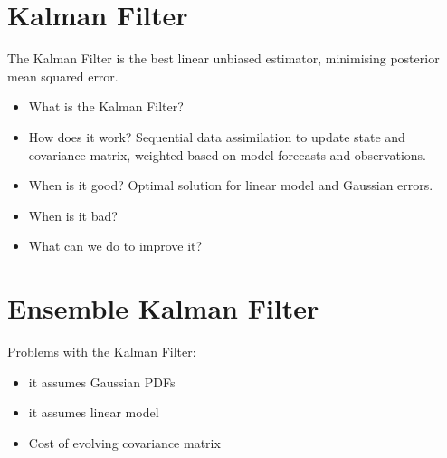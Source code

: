 \section{Kalman Filter}\label{sec:method:kf}

The Kalman Filter \citep{kalman1960new} is the best linear unbiased estimator,
minimising posterior mean squared error.

\begin{itemize}
    \item What is the Kalman Filter?
    \item How does it work? Sequential data assimilation to update state and
        covariance matrix, weighted based on model forecasts and observations.
    \item When is it good? Optimal solution for linear model and Gaussian
        errors.
    \item When is it bad?
    \item What can we do to improve it?
\end{itemize}

\section{Ensemble Kalman Filter}\label{sec:method:enkf}

Problems with the Kalman Filter:
\begin{itemize}
    \item it assumes Gaussian PDFs
    \item it assumes linear model
    \item Cost of evolving covariance matrix
\end{itemize}

